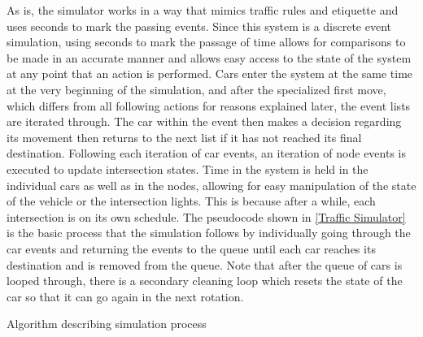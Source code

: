 As is, the simulator works in a way that mimics traffic rules and etiquette and uses seconds to mark the passing events.  Since this system is a discrete event simulation, using seconds to mark the passage of time allows for comparisons to be made in an accurate manner and allows easy access to the state of the system at any point that an action is performed.  Cars enter the system at the same time at the very beginning of the simulation, and after the specialized first move, which differs from all following actions for reasons explained later, the event lists are iterated through.   The car within the event then makes a decision regarding its movement then returns to the next list if it has not reached its final destination.  Following each iteration of car events, an iteration of node events is executed to update intersection states.  Time in the system is held in the individual cars as well as  in the nodes, allowing for easy manipulation of the state of the vehicle or the intersection lights.   This is because after a while, each intersection is on its own schedule.  The pseudocode shown in \ref{Traffic Simulator} is the basic process that the simulation follows by individually going through the car events and returning the events to the queue until each car reaches its destination and is removed from the queue.  Note that after the queue of cars is looped through, there is a secondary cleaning loop which resets the state of the car so that it can go again in the next rotation.

\begin{algorithm}[h]
 \SetAlgoLined
 \caption{Algorithm describing simulation process}
 \label{Traffic Simulator}
\end{algorithm}

